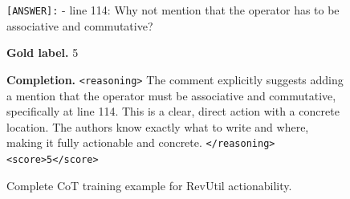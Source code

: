 \begin{figure}[p]
{\begin{minipage}{0.95\textwidth}
\medskip
\texttt{[ANSWER]:} - line 114: Why not mention that the operator has to be
associative and commutative?

\medskip
\textbf{Gold label.} 5

\medskip
\textbf{Completion.}
\texttt{<reasoning>} The comment explicitly suggests adding a mention that the
operator must be associative and commutative, specifically at line 114. This
is a clear, direct action with a concrete location. The authors know exactly
what to write and where, making it fully actionable and concrete.
\texttt{</reasoning>} \texttt{<score>5</score>}
\end{minipage}%
}
\caption{Complete CoT training example for RevUtil actionability.}
\label{fig:cot-example}
\end{figure}

\clearpage

